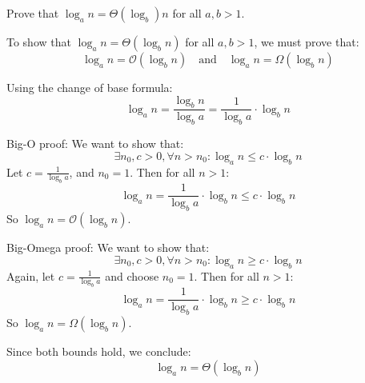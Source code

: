 Prove that  $\log_{a} n = \Theta (\log_{b}) n$ for all $a, b > 1$.
\begin{customsolutionbox}
    To show that $\log_{a} n = \Theta(\log_{b} n)$ for all $a, b > 1$, we must prove that:
    \[
    \log_{a} n = \mathcal{O}(\log_{b} n) \quad \text{and} \quad \log_{a} n = \Omega(\log_{b} n)
    \]
    
    Using the change of base formula:
    \[
    \log_{a} n = \frac{\log_{b} n}{\log_{b} a} = \frac{1}{\log_{b} a} \cdot \log_{b} n
    \]
    
    Big-O proof: We want to show that:
    \[
    \exists n_0, c > 0, \forall n > n_0: \log_{a} n \leq c \cdot \log_{b} n
    \]
    Let $c = \frac{1}{\log_{b} a}$, and $n_0 = 1$. Then for all $n > 1$:
    \[
    \log_{a} n = \frac{1}{\log_{b} a} \cdot \log_{b} n \leq c \cdot \log_{b} n
    \]
    So $\log_{a} n = \mathcal{O}(\log_{b} n)$.
    
    Big-Omega proof: We want to show that:
    \[
    \exists n_0, c > 0, \forall n > n_0: \log_{a} n \geq c \cdot \log_{b} n
    \]
    Again, let $c = \frac{1}{\log_{b} a}$ and choose $n_0 = 1$. Then for all $n > 1$:
    \[
    \log_{a} n = \frac{1}{\log_{b} a} \cdot \log_{b} n \geq c \cdot \log_{b} n
    \]
    So $\log_{a} n = \Omega(\log_{b} n)$.
    
    Since both bounds hold, we conclude:
    \[
    \log_{a} n = \Theta(\log_{b} n)
    \]
    \end{customsolutionbox}
    